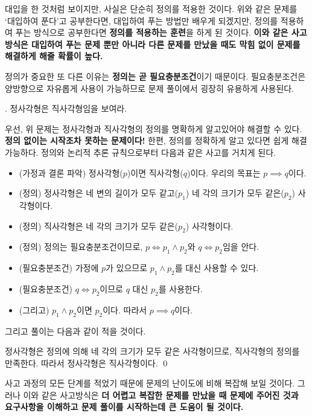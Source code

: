 대입을 한 것처럼 보이지만, 사실은 단순히 정의를 적용한 것이다. 위와 같은 문제를 `대입하여 푼다'고 공부한다면, 대입하여 푸는 방법만 배우게 되겠지만, 정의를 적용하여 푸는 방식으로 공부한다면 \textbf{정의를 적용하는 훈련}을 하게 된 것이다. \textbf{이와 같은 사고방식은 대입하여 푸는 문제 뿐만 아니라 다른 문제를 만났을 때도 막힘 없이 문제를 해결하게 해줄 확률이 높다.}

정의가 중요한 또 다른 이유는 \textbf{정의는 곧 필요충분조건}이기 때문이다. 필요충분조건은 양방향으로 자유롭게 사용이 가능하므로 문제 풀이에서 굉장히 유용하게 사용된다.

\bigskip

\ex. 정사각형은 직사각형임을 보여라.

\pagebreak

우선, 위 문제는 정사각형과 직사각형의 정의를 명확하게 알고있어야 해결할 수 있다. \textbf{정의 없이는 시작조차 못하는 문제이다!} 한편, 정의를 정확하게 알고 있다면 쉽게 해결 가능하다. 정의와 논리적 추론 규칙으로부터 다음과 같은 사고를 거치게 된다.

\begin{itemize}
    \item (가정과 결론 파악) 정사각형(\(p\))이면 직사각형(\(q\))이다. 우리의 목표는 \(p \implies q\)이다.
    \item (정의) 정사각형은 네 변의 길이가 모두 같고(\(p_1\)) 네 각의 크기가 모두 같은(\(p_2\)) 사각형이다.
    \item (정의) 직사각형은 네 각의 크기가 모두 같은(\(p_2\)) 사각형이다.
    \item (정의) 정의는 필요충분조건이므로, \(p \iff p_1 \wedge p_2\)와 \(q \iff p_2\)임을 안다.
    \item (필요충분조건) 가정에 \(p\)가 있으므로 \(p_1 \wedge p_2\)를 대신 사용할 수 있다.
    \item (필요충분조건) \(q \iff p_2\)이므로 \(q\) 대신 \(p_2\)를 사용한다.
    \item (그리고) \(p_1 \wedge p_2\)이면 \(p_2\)이다. 따라서 \(p \implies q\)이다.
\end{itemize}

그리고 풀이는 다음과 같이 적을 것이다.

\pf 정사각형은 정의에 의해 네 각의 크기가 모두 같은 사각형이므로, 직사각형의 정의를 만족한다. 따라서 정사각형은 직사각형이다. \qed

사고 과정의 모든 단계를 적었기 때문에 문제의 난이도에 비해 복잡해 보일 것이다. 그러나 이와 같은 사고방식은 \textbf{더 어렵고 복잡한 문제를 만났을 때 문제에 주어진 것과 요구사항을 이해하고 문제 풀이를 시작하는데 큰 도움이 될 것이다.}

